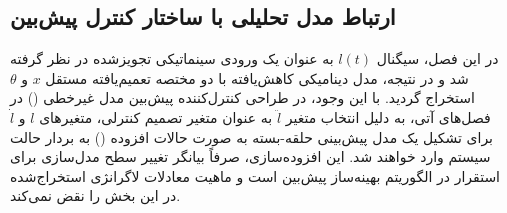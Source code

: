 \subsection{ارتباط مدل تحلیلی با ساختار کنترل پیش‌بین}
در این فصل، سیگنال $l(t)$ به عنوان یک ورودی سینماتیکی تجویزشده در نظر گرفته شد و در نتیجه، مدل دینامیکی کاهش‌یافته با دو مختصه تعمیم‌یافته مستقل $x$ و $\theta$ استخراج گردید. با این وجود، در طراحی کنترل‌کننده پیش‌بین مدل غیرخطی () در فصل‌های آتی، به دلیل انتخاب متغیر $\ddot{l}$ به عنوان متغیر تصمیم کنترلی، متغیرهای $l$ و $\dot{l}$ برای تشکیل یک مدل پیش‌بینی حلقه-بسته به صورت حالات افزوده () به بردار حالت سیستم وارد خواهند شد. این افزوده‌سازی، صرفاً بیانگر تغییر سطح مدل‌سازی برای استقرار در الگوریتم بهینه‌ساز پیش‌بین است و ماهیت معادلات لاگرانژی استخراج‌شده در این بخش را نقض نمی‌کند.